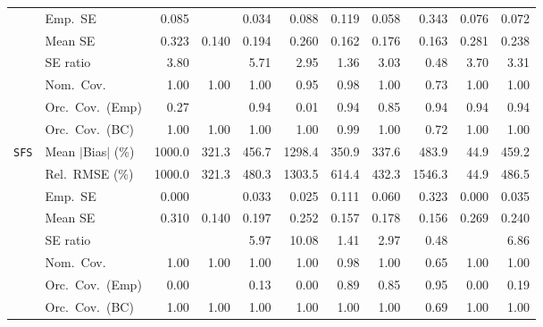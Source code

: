 \begin{landscape}
\begin{longtable}{llrrrrrrrrr}
 & Emp.\ SE & 0.085 &  & 0.034 & 0.088 & 0.119 & 0.058 & 0.343 & 0.076 & 0.072 \\
 & Mean SE & 0.323 & 0.140 & 0.194 & 0.260 & 0.162 & 0.176 & 0.163 & 0.281 & 0.238 \\
 & SE ratio & 3.80 &  & 5.71 & \cellcolor{rankthree}2.95 & \cellcolor{rankone}1.36 & 3.03 & \cellcolor{ranktwo}0.48 & 3.70 & 3.31 \\
 & Nom.\ Cov. & \cellcolor{rankthree}1.00 & \cellcolor{rankthree}1.00 & \cellcolor{rankthree}1.00 & \cellcolor{rankone}0.95 & \cellcolor{ranktwo}0.98 & \cellcolor{rankthree}1.00 & 0.73 & \cellcolor{rankthree}1.00 & \cellcolor{rankthree}1.00 \\
 & Orc.\ Cov.\ (Emp) & \cellcolor{rankthree}0.27 &  & \cellcolor{rankone}0.94 & 0.01 & \cellcolor{rankone}0.94 & \cellcolor{ranktwo}0.85 & \cellcolor{rankone}0.94 & \cellcolor{rankone}0.94 & \cellcolor{rankone}0.94 \\
 & Orc.\ Cov.\ (BC) & \cellcolor{ranktwo}1.00 & \cellcolor{ranktwo}1.00 & \cellcolor{ranktwo}1.00 & \cellcolor{ranktwo}1.00 & \cellcolor{rankone}0.99 & \cellcolor{ranktwo}1.00 & \cellcolor{rankthree}0.72 & \cellcolor{ranktwo}1.00 & \cellcolor{ranktwo}1.00 \\
\addlinespace[2pt]
\quad \texttt{SFS} & Mean $|$Bias$|$ (\%) & 1000.0 & \cellcolor{ranktwo}321.3 & 456.7 & 1298.4 & 350.9 & \cellcolor{rankthree}337.6 & 483.9 & \cellcolor{rankone}44.9 & 459.2 \\
 & Rel.\ RMSE (\%) & 1000.0 & \cellcolor{ranktwo}321.3 & 480.3 & 1303.5 & 614.4 & \cellcolor{rankthree}432.3 & 1546.3 & \cellcolor{rankone}44.9 & 486.5 \\
 & Emp.\ SE & 0.000 &  & 0.033 & 0.025 & 0.111 & 0.060 & 0.323 & 0.000 & 0.035 \\
 & Mean SE & 0.310 & 0.140 & 0.197 & 0.252 & 0.157 & 0.178 & 0.156 & 0.269 & 0.240 \\
 & SE ratio &  &  & 5.97 & 10.08 & \cellcolor{rankone}1.41 & \cellcolor{rankthree}2.97 & \cellcolor{ranktwo}0.48 &  & 6.86 \\
 & Nom.\ Cov. & \cellcolor{ranktwo}1.00 & \cellcolor{ranktwo}1.00 & \cellcolor{ranktwo}1.00 & \cellcolor{ranktwo}1.00 & \cellcolor{rankone}0.98 & \cellcolor{ranktwo}1.00 & \cellcolor{rankthree}0.65 & \cellcolor{ranktwo}1.00 & \cellcolor{ranktwo}1.00 \\
 & Orc.\ Cov.\ (Emp) & 0.00 &  & 0.13 & 0.00 & \cellcolor{ranktwo}0.89 & \cellcolor{rankthree}0.85 & \cellcolor{rankone}0.95 & 0.00 & 0.19 \\
 & Orc.\ Cov.\ (BC) & \cellcolor{rankone}1.00 & \cellcolor{rankone}1.00 & \cellcolor{rankone}1.00 & \cellcolor{rankone}1.00 & \cellcolor{rankone}1.00 & \cellcolor{rankone}1.00 & \cellcolor{ranktwo}0.69 & \cellcolor{rankone}1.00 & \cellcolor{rankone}1.00 \\

\end{longtable}
\end{landscape}
